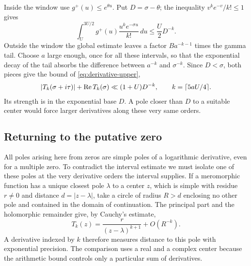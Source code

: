 \begin{construction}
\caption{Placement of the derivative kernel on the logarithmic scale (schematic).
The shaded interval is where the arithmetic estimate holds. Its length is \(U/2\);
the effective width of the gamma density for the tail estimate is of order
\(\sqrt{U}\) with \(a\) fixed.}\label{fig:analytic-road}
\end{construction}

Inside the window use \(g^+(u)\le e^{\theta u}\). Put
\(D=\sigma-\theta\); the inequality \(v^ke^{-v}/k!\le1\) gives
\[
 \int_U^{3U/2}g^+(u)\frac{u^k e^{-\sigma u}}{k!}\,du
              \le \frac{U}{2}D^{-k}.
\]
Outside the window the global estimate leaves a factor
\(Ba^{-k-1}\) times the gamma tail. Choose \(a\) large enough,
once for all these intervals, so that the exponential decay of the
tail absorbs the difference between \(a^{-k}\) and \(\sigma^{-k}\).
Since \(D<\sigma\), both pieces give the bound of
\eqref{eq:derivative-upper},
\[
 |T_k(\sigma+i\tau)|+\operatorname{Re} T_k(\sigma)
       \ll (1+U)D^{-k},\qquad k=\lceil 5aU/4\rceil .
\]
Its strength is in the exponential base \(D\). A pole closer than
\(D\) to a suitable center would force larger derivatives along
these very same orders.

\subsection{Returning to the putative zero}

All poles arising here from zeros are simple poles of a logarithmic derivative, even for a multiple zero. To contradict the interval estimate we must isolate one of these poles at the very
derivative orders the interval supplies. If a meromorphic
function has a unique closest pole \(\lambda\) to a center \(z\),
which is simple with residue \(r\ne0\) and distance \(d=|z-\lambda|\), take a
circle of radius \(R>d\) enclosing no other pole and contained
in the domain of continuation. The principal part and the holomorphic
remainder give, by Cauchy's estimate,
\[
       T_k(z)=\frac{r}{(z-\lambda)^{k+1}}+O(R^{-k}).
\]
A derivative indexed by \(k\) therefore measures distance to this
pole with exponential precision. The comparison uses a real and a
complex center because the arithmetic bound controls only a
particular sum of derivatives.

